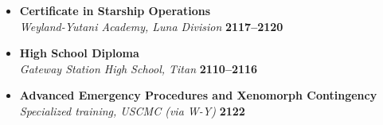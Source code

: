 
\begin{itemize}[label={}, leftmargin=0.5em, noitemsep, topsep=2pt, parsep=0pt]
    \item \textbf{Certificate in Starship Operations} \\
          \textit{Weyland-Yutani Academy, Luna Division} \hfill \textbf{2117–2120} \\

    \item \textbf{High School Diploma} \\
          \textit{Gateway Station High School, Titan} \hfill \textbf{2110–2116} \\

    \item \textbf{Advanced Emergency Procedures and Xenomorph Contingency} \\
          \textit{Specialized training, USCMC (via W-Y)} \hfill \textbf{2122}
\end{itemize}
\vspace{0.5cm}
